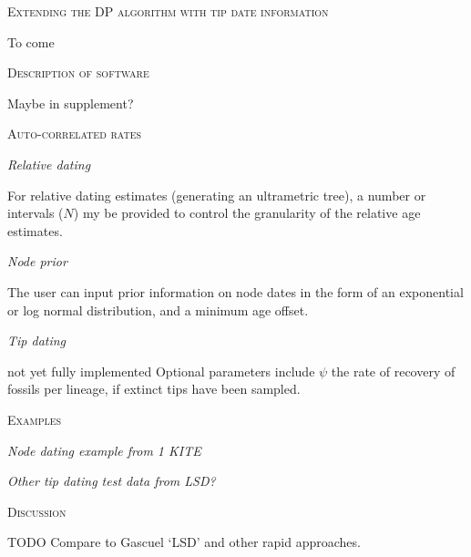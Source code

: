 \documentclass{llncs}
\newcommand{\ejmcomment}[1]{{\color{green} #1}}
\renewcommand{\section}[1]{%
\bigskip
\begin{center}
\begin{Large}
\normalfont\scshape #1
\medskip
\end{Large}
\end{center}}
\renewcommand{\subsection}[1]{%
\bigskip
\begin{center}
\begin{large}
\normalfont\itshape #1
\end{large}
\end{center}}
\begin{document}
\section{Extending the DP algorithm with tip date information}
To come

\section{Description of software}
Maybe in supplement?

\section {Auto-correlated rates}


\subsection{Relative dating}
For relative dating estimates (generating an ultrametric tree), a number or
intervals ($N$) my be provided to control the granularity of the relative age
estimates.


\subsection{Node prior}
The user can input prior information on node dates in the form of an exponential
or log normal distribution, and a minimum age offset.



\subsection{Tip dating}
\ejmcomment{not yet fully implemented}
Optional parameters include $\psi$ the rate of recovery of fossils per lineage, 
if extinct tips have been sampled.



\section{Examples}
\subsection{Node dating example from 1 KITE}

\subsection{Other tip dating test data from LSD?}

\section{Discussion}

TODO Compare to Gascuel `LSD' and other rapid approaches.





\end{document}
